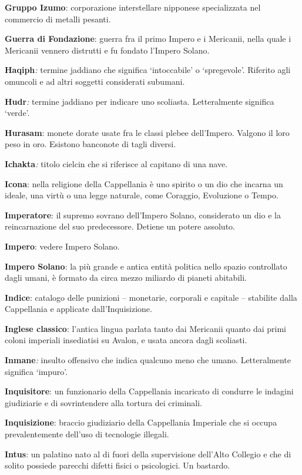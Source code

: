 \textbf{Gruppo Izumo}: corporazione interstellare nipponese
specializzata nel commercio di metalli pesanti.

\textbf{Guerra di Fondazione}: guerra fra il primo Impero e i Mericanii,
nella quale i Mericanii vennero distrutti e fu fondato l'Impero Solano.

\textbf{Haqiph}\emph{:} termine jaddiano che significa `intoccabile' o
`spregevole'. Riferito agli omuncoli e ad altri soggetti considerati
subumani.

\textbf{Hudr}\emph{:} termine jaddiano per indicare uno scoliasta.
Letteralmente significa `verde'.

\textbf{Hurasam}: monete dorate usate fra le classi plebee dell'Impero.
Valgono il loro peso in oro. Esistono banconote di tagli diversi.

\textbf{Ichakta}\emph{:} titolo cielcin che si riferisce al capitano di
una nave.

\textbf{Icona}: nella religione della Cappellania è uno spirito o un dio
che incarna un ideale, una virtù o una legge naturale, come Coraggio,
Evoluzione o Tempo.

\textbf{Imperatore}: il supremo sovrano dell'Impero Solano, considerato
un dio e la reincarnazione del suo predecessore. Detiene un potere
assoluto.

\textbf{Impero}: vedere Impero Solano.

\textbf{Impero Solano}: la più grande e antica entità politica nello
spazio controllato dagli umani, è formato da circa mezzo miliardo di
pianeti abitabili.

\textbf{Indice}: catalogo delle punizioni -- monetarie, corporali e
capitale -- stabilite dalla Cappellania e applicate dall'Inquisizione.

\textbf{Inglese classico}: l'antica lingua parlata tanto dai Mericanii
quanto dai primi coloni imperiali insediatisi su Avalon, e usata ancora
dagli scoliasti.

\textbf{Inmane}\emph{:} insulto offensivo che indica qualcuno meno che
umano. Letteralmente significa `impuro'.

\textbf{Inquisitore}: un funzionario della Cappellania incaricato di
condurre le indagini giudiziarie e di sovrintendere alla tortura dei
criminali.

\textbf{Inquisizione}: braccio giudiziario della Cappellania Imperiale
che si occupa prevalentemente dell'uso di tecnologie illegali.

\textbf{Intus}: un palatino nato al di fuori della supervisione
dell'Alto Collegio e che di solito possiede parecchi difetti fisici o
psicologici. Un bastardo.

